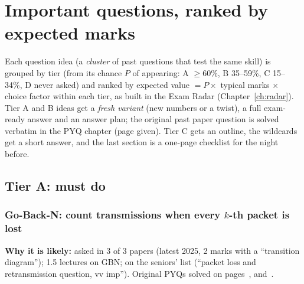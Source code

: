 \chapter{Important questions, ranked by expected marks}
\label{ch:iq}
Each question idea (a \emph{cluster} of past questions that test the same skill) is grouped by tier (from its chance $P$ of appearing: A $\ge60\%$, B 35--59\%, C 15--34\%, D never asked) and ranked by expected value  $=P\times$ typical marks $\times$ choice factor within each tier, as built in the Exam Radar (Chapter~\ref{ch:radar}).
Tier A and B ideas get a \emph{fresh variant} (new numbers or a twist), a full exam-ready answer and an answer plan; the original past paper question is solved verbatim in the PYQ chapter (page given).
Tier C gets an outline, the wildcards get a short answer, and the last section is a one-page checklist for the night before.

\section{Tier A: must do}

\subsection{Go-Back-N: count transmissions when every $k$-th packet is lost}\label{iq:C25}
    

\textbf{Why it is likely:} asked in 3 of 3 papers (latest 2025, 2 marks with a ``transition diagram''); 1.5 lectures on GBN; on the seniors' list (``packet loss and retransmission question, vv imp''). Original PYQs solved on pages~\pageref{q:MS2025-3b}, \pageref{q:MS2024-4b} and~\pageref{q:MS2022-1a}.

